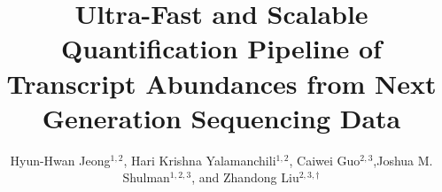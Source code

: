 \documentclass{ws-procs11x85}
\begin{document}
\title{Ultra-Fast and Scalable Quantification Pipeline of Transcript Abundances from Next Generation Sequencing Data}

\author{Hyun-Hwan Jeong$^{1,2}$, Hari Krishna Yalamanchili$^{1,2}$, Caiwei Guo$^{2,3}$,Joshua M. Shulman$^{1,2,3}$, and Zhandong Liu$^{2,3,\dag}$}

\address{$^{1}$Department of Molecular and Human Genetics, Baylor College of Medicine,\\
$^{2}$Jan and Dan Duncan Neurological Research Institute, Texas Children’s Hospital,\\
$^{3}$Department of Neuroscience, Baylor College of Medicine,\\
$^{4}$Department of Pediatrics, Baylor College of Medicine,\\
Houston, Texas 77030, USA\\
$^{\dag}$E-mail: zhandonl@bcm.edu}
\end{document}
